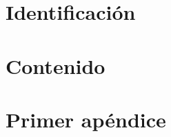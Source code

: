 \newcommand{\nombrearchivo}{Plantilla de prueba}
\newcommand{\titulodocumento}{Plantilla de prueba en \LaTeX}
\newcommand{\tipodocumento}{Tipo de documento}
\newcommand{\fecha}{Marzo 2013}


\usepackage[toc,page]{appendix}
\usepackage{hyperref}
\usepackage{amsmath}
\usepackage{subcaption}
\usepackage{tabu}
\usepackage{listings}

\renewcommand{\appendixname}{Apéndices}
\renewcommand{\appendixtocname}{Apéndices}
\renewcommand{\appendixpagename}{Apéndices}




\pagestyle{fancy}
\setcounter{page}{1}
\section*{Identificación}

\clearpage
\tableofcontents
{}
\listoffigures
\listoftables

\clearpage
{}
\setcounter{page}{1}

\section{Contenido}

\clearpage



\clearpage
\appendix
\noappendicestocpagenum
\addappheadtotoc
\appendixpage
\section{Primer apéndice}


\clearpage


